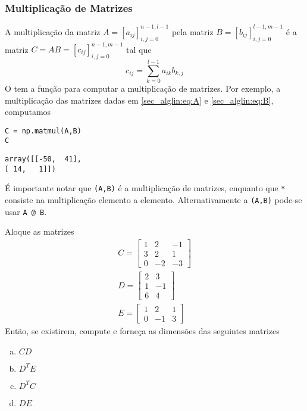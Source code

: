 \documentclass[a4paper,10pt,twoside]{article}
\begin{document}
\subsubsection{Multiplicação de Matrizes}

A multiplicação da matriz $A = [a_{ij}]_{i,j=0}^{n-1,l-1}$ pela matriz $B = [b_{ij}]_{i,j=0}^{l-1,m-1}$ é a matriz $C = AB = [c_{ij}]_{i,j=0}^{n-1,m-1}$ tal que
\begin{equation}
  c_{ij} = \sum_{k=0}^{l-1} a_{ik}b_{k,j}
\end{equation}
O {\PYTHONnumpy} tem a função {\PYTHONnumpyDOTmatmul} para computar a multiplicação de matrizes. Por exemplo, a multiplicação das matrizes dadas em \eqref{sec_alglin:eq:A} e \eqref{sec_alglin:eq:B}, computamos

\begin{lstlisting}
C = np.matmul(A,B)
C
\end{lstlisting}

\begin{verbatim}
array([[-50,  41],
[ 14,   1]])
\end{verbatim}

\begin{obs}
  É importante notar que {\PYTHONnumpyDOTmatmul}\texttt{(A,B)} é a multiplicação de matrizes, enquanto que \texttt{*} consiste na multiplicação elemento a elemento. Alternativamente a {\PYTHONnumpyDOTmatmul}\texttt{(A,B)} pode-se usar \texttt{A @ B}.
\end{obs}

\begin{exr}
  Aloque as matrizes
  \begin{gather}
    C =
    \begin{bmatrix}
      1 & 2 & -1 \\
      3 & 2 & 1 \\
      0 & -2 & -3
    \end{bmatrix}\\
    D =
    \begin{bmatrix}
      2 & 3 \\
      1 & -1 \\
      6 & 4
    \end{bmatrix}\\
    E =
    \begin{bmatrix}
      1 & 2 & 1 \\
      0 & -1 & 3
    \end{bmatrix}
  \end{gather}
  Então, se existirem, compute e forneça as dimensões das seguintes matrizes
  \begin{enumerate}[a)]
  \item $CD$
  \item $D^TE$
  \item $D^TC$
  \item $DE$
  \end{enumerate}
\end{exr}
\end{document}

